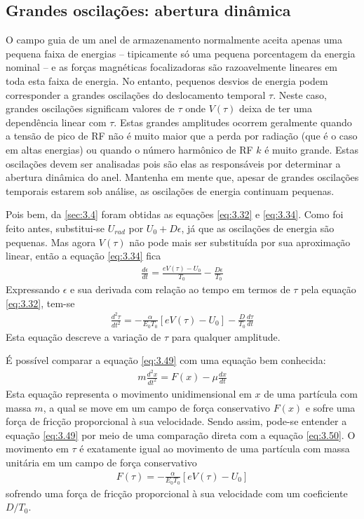 \subsection{Grandes oscilações: abertura dinâmica}\label{sec:3.6}
O campo guia de um anel de armazenamento normalmente aceita apenas uma pequena faixa de energias -- tipicamente só uma pequena porcentagem da energia nominal -- e as forças magnéticas focalizadoras são razoavelmente lineares em toda esta faixa de energia. No entanto, pequenos desvios de energia podem corresponder a grandes oscilações do deslocamento temporal $\tau$. Neste caso, grandes oscilações significam valores de $\tau$ onde $V(\tau)$ deixa de ter uma dependência linear com $\tau$. Estas grandes amplitudes ocorrem geralmente quando a tensão de pico de RF não é muito maior que a perda por radiação (que é o caso em altas energias) ou quando o número harmônico de RF $k$ é muito grande. Estas oscilações devem ser analisadas pois são elas as responsáveis por determinar a abertura dinâmica do anel. Mantenha em mente que, apesar de grandes oscilações temporais estarem sob análise, as oscilações de energia continuam pequenas.

Pois bem, da \autoref{sec:3.4} foram obtidas as equações \eqref{eq:3.32} e \eqref{eq:3.34}. Como foi feito antes, substitui-se $U_{rad}$ por $U_0 +D\epsilon$, já que as oscilações de energia são pequenas. Mas agora $V(\tau)$ não pode mais ser substituída por sua aproximação linear, então a equação \eqref{eq:3.34} fica
\begin{align}
	\frac{d\epsilon}{dt} = \frac{eV(\tau) - U_0}{T_0} - \frac{D\epsilon}{T_0}
\end{align}
Expressando $\epsilon$ e sua derivada com relação ao tempo em termos de $\tau$ pela equação \eqref{eq:3.32}, tem-se
\begin{align}
	\frac{d^2 \tau}{dt^2} = -\frac{\alpha}{E_0 T_0}[eV(\tau)-U_0] - \frac{D}{T_0}\frac{d\tau}{dt}\label{eq:3.49}
\end{align}
Esta equação descreve a variação de $\tau$ para qualquer amplitude.

É possível comparar a equação \eqref{eq:3.49} com uma equação bem conhecida:
\begin{align}
	m\frac{d^2x}{dt^2} = F(x) - \mu\frac{dx}{dt}\label{eq:3.50}
\end{align}
Esta equação representa o movimento unidimensional em $x$ de uma partícula com massa $m$, a qual se move em um campo de força conservativo $F(x)$ e sofre uma força de fricção proporcional à sua velocidade. Sendo assim, pode-se entender a equação \eqref{eq:3.49} por meio de uma comparação direta com a equação \eqref{eq:3.50}. O movimento em $\tau$ é exatamente igual ao movimento de uma partícula com massa unitária em um campo de força conservativo
\begin{align}
	F(\tau) = -\frac{\alpha}{E_0 T_0}[eV(\tau) - U_0]\label{eq:3.51}
\end{align}
sofrendo uma força de fricção proporcional à sua velocidade com um coeficiente $D/T_0$.

